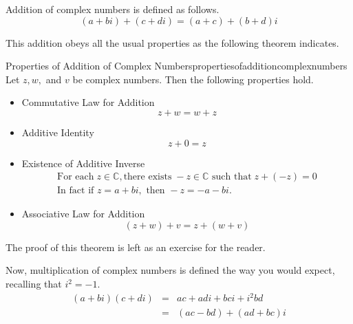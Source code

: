 Addition of complex numbers is defined as follows.
\begin{equation*}
\left( a+bi\right) +\left( c+di\right) =\left( a+c\right) +\left( b+d\right)i
\end{equation*}

This addition obeys all the usual properties as the following theorem indicates.

\begin{theorem}{Properties of Addition of Complex Numbers}{propertiesofadditioncomplexnumbers}
Let $z,w,$ and $v$ be complex numbers. Then the following properties hold.
\begin{itemize}
\item Commutative Law for Addition
\begin{equation*}
z+w=w+z
\end{equation*}

\item Additive Identity
\begin{equation*}
z+0=z
\end{equation*}

\item Existence of Additive Inverse
\begin{equation*}
\begin{array}{l}
\mbox{For each} \; z\in \mathbb{C}, \mbox{there exists}\; -z\in \mathbb{C} \mbox{ such that}\; 
z+\left( -z\right) =0 \\
\mbox{In fact if } z=a+bi, \mbox{ then } -z=-a-bi.
\end{array}
\end{equation*}

\item Associative Law for Addition
\begin{equation*}
\left( z+w\right) +v= z +\left( w+v\right)
\end{equation*}
\end{itemize}
\end{theorem}

The proof of this theorem is left as an exercise for the reader.

Now, multiplication of complex numbers is defined the way you would expect, recalling that $i^{2} = -1$.
\begin{eqnarray*}
\left( a+bi\right) \left( c+di\right) &=&ac+adi+bci+i^{2}bd \\
&=&\left( ac-bd\right) +\left( ad + bc \right)i 
\end{eqnarray*}

